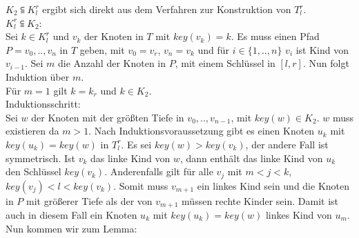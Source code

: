 \documentclass[a4paper,12pt]{article}
\begin{document}
 \noindent $K_2 \subseteqq  K^r_l$ ergibt sich direkt aus dem Verfahren zur Konstruktion von $T^r_l$.\\
 
 \noindent $ K^r_l \subseteqq K_2$:\\
 Sei $k \in K^r_l$ und $v_k$ der Knoten in $T$ mit $\mathit{key}(v_k) = k$. Es muss einen Pfad $P = v_0,..,v_n$ in $T$ geben, mit $v_0 = v_r$, $v_n = v_k$ und für $i \in \{1,..,n\}$ $v_i$ ist Kind von $v_{i-1}$. Sei $m$ die Anzahl der Knoten in $P$, mit einem Schlüssel in  $\left[l,r\right]$. Nun folgt Induktion über $m$.\\
  Für $m = 1$ gilt $k = k_r$  und $k \in K_2$. \\
  Induktionsschritt:\\
  Sei $w$ der Knoten mit der größten Tiefe in $ v_0,..,v_{n-1}$, mit $\mathit{key}(w) \in  K_2$. $w$ muss existieren da $m > 1$. Nach Induktionsvoraussetzung gibt es einen Knoten $u_k$ mit $\mathit{key}(u_k) = \mathit{key}(w)$ in $T^r_l$. Es sei $\mathit{key}(w) > \mathit{key}(v_k)$, der andere Fall ist symmetrisch. Ist $v_k$ das linke Kind von $w$, dann enthält das linke Kind von $u_k$ den Schlüssel $\mathit{key}(v_k)$. Anderenfalls gilt für alle $v_j$ mit $m < j < k$, $\mathit{key}(v_j) < l < \mathit{key}(v_k)$. Somit muss $v_{m+1}$ ein linkes Kind sein und die Knoten in $P$ mit größerer Tiefe als der von $v_{m+1}$ müssen rechte Kinder sein. Damit ist auch in diesem Fall ein Knoten $u_k$ mit $\mathit{key}(u_k) = \mathit{key}(w)$ linkes Kind von $u_m$.  \\
  
 \noindent Nun kommen wir zum Lemma:\\
 
 


	    
	 
\end{document}
